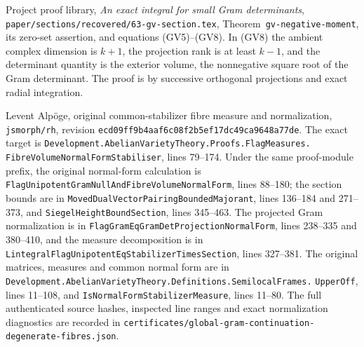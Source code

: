 Project proof library, \emph{An exact integral for small Gram
determinants}, \texttt{paper/sections/recovered/63-gv-section.tex},
Theorem~\texttt{gv-negative-moment}, its zero-set assertion, and
equations (GV5)--(GV8).  In (GV8) the ambient complex dimension
is $k+1$, the projection rank is at least $k-1$, and the
determinant quantity is the exterior volume, the nonnegative
square root of the Gram determinant.  The proof is by successive
orthogonal projections and exact radial integration.

Levent Alp\"oge, original common-stabilizer fibre measure and
normalization, \texttt{jsmorph/rh}, revision
\texttt{ecd09ff9b4aaf6c08f2b5ef17dc49ca9648a77de}.
The exact target is
\texttt{Development.AbelianVarietyTheory.Proofs.FlagMeasures.}
\texttt{FibreVolumeNormalFormStabiliser}, lines 79--174.
Under the same proof-module prefix, the original normal-form
calculation is \texttt{FlagUnipotentGramNullAndFibreVolumeNormalForm},
lines 88--180; the section bounds are in
\texttt{MovedDualVectorPairingBoundedMajorant}, lines 136--184 and
271--373, and \texttt{SiegelHeightBoundSection}, lines 345--463.
The projected Gram normalization is in
\texttt{FlagGramEqGramDetProjectionNormalForm}, lines 238--335
and 380--410, and the measure decomposition is in
\texttt{LintegralFlagUnipotentEqStabilizerTimesSection},
lines 327--381.
The original matrices, measures and common normal form are in
\texttt{Development.AbelianVarietyTheory.Definitions.SemilocalFrames.}
\texttt{UpperOff}, lines 11--108, and
\texttt{IsNormalFormStabilizerMeasure}, lines 11--80.
The full authenticated source hashes, inspected line ranges and
exact normalization diagnostics are recorded in
\texttt{certificates/global-gram-continuation-degenerate-fibres.json}.
